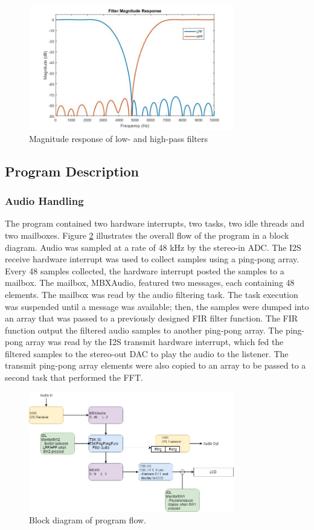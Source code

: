 \documentclass[11pt,pdftex,portrait,letterpaper]{article}
\begin{document}
\begin{figure}[h]
\centering
\includegraphics[width=0.8\textwidth]{./filtMag}
\caption{Magnitude response of low- and high-pass filters}
\label{f:fig1}
\end{figure}

\subsection{Program Description}

\subsubsection {Audio Handling}
The program contained two hardware interrupts, two tasks, two idle threads and two mailboxes. Figure \ref{f:fig2} illustrates the overall flow of the program in a block diagram. Audio was sampled at a rate of 48 kHz by the stereo-in ADC. The I2S receive hardware interrupt was used to collect samples using a ping-pong array. Every 48 samples collected, the hardware interrupt posted the samples to a mailbox. The mailbox, MBXAudio, featured two messages, each containing 48 elements. The mailbox was read by the audio filtering task. The task execution was suspended until a message was available; then, the samples were dumped into an array that was passed to a previously designed FIR filter function. The FIR function output the filtered audio samples to another ping-pong array. The ping-pong array was read by the I2S transmit hardware interrupt, which fed the filtered samples to the stereo-out DAC to play the audio to the listener. The transmit ping-pong array elements were also copied to an array to be passed to a second task that performed the FFT.  

\begin{figure}[h]
\centering
\includegraphics[width=0.8\textwidth]{./blocks}
\caption{Block diagram of program flow.}
\label{f:fig2}
\end{figure}
\end{document}
